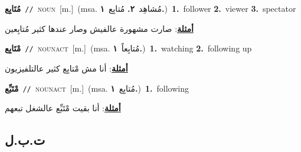 \documentclass[10pt,a4paper,twoside]{article} %
\begin{document}
\begin{multicols}{2}
{\setlength\topsep{0pt}\textbf{\foreignlanguage{arabic}{مُتَابِع}}\ {\color{gray}\texttt{//}\color{black}}\ \textsc{noun}\ [m.]\ \color{gray}(msa. \foreignlanguage{arabic}{مُشاهِد}~\foreignlanguage{arabic}{\textbf{٢.}}  \foreignlanguage{arabic}{مُتابِع}~\foreignlanguage{arabic}{\textbf{١.}})\color{black}\ \textbf{1.}~follower  \textbf{2.}~viewer  \textbf{3.}~spectator\  \begin{flushright}\color{gray}\foreignlanguage{arabic}{\textbf{\underline{\foreignlanguage{arabic}{أمثلة}}}: صارت مشهورة عالفيش وصار عندها كثير مُتابِعين}\end{flushright}\color{black}} \vspace{2mm}

{\setlength\topsep{0pt}\textbf{\foreignlanguage{arabic}{مْتَابِع}}\ {\color{gray}\texttt{//}\color{black}}\ \textsc{noun\textunderscore act}\ [m.]\ \color{gray}(msa. \foreignlanguage{arabic}{مُتابِعاً}~\foreignlanguage{arabic}{\textbf{١.}})\color{black}\ \textbf{1.}~watching  \textbf{2.}~following up\  \begin{flushright}\color{gray}\foreignlanguage{arabic}{\textbf{\underline{\foreignlanguage{arabic}{أمثلة}}}: أنا مش مْتابِع كثير عالتلفيزيون}\end{flushright}\color{black}} \vspace{2mm}

{\setlength\topsep{0pt}\textbf{\foreignlanguage{arabic}{مْتَبِّع}}\ {\color{gray}\texttt{//}\color{black}}\ \textsc{noun\textunderscore act}\ [m.]\ \color{gray}(msa. \foreignlanguage{arabic}{مُتابِع}~\foreignlanguage{arabic}{\textbf{١.}})\color{black}\ \textbf{1.}~following\  \begin{flushright}\color{gray}\foreignlanguage{arabic}{\textbf{\underline{\foreignlanguage{arabic}{أمثلة}}}: أنا بقيت مْتَبِّع عالشغل تبعهم}\end{flushright}\color{black}} \vspace{2mm}

\vspace{-3mm}
\subsection*{\color{blue}\foreignlanguage{arabic}{ت.ب.ل}\color{blue}{}} 


\end{multicols}
\end{document}
